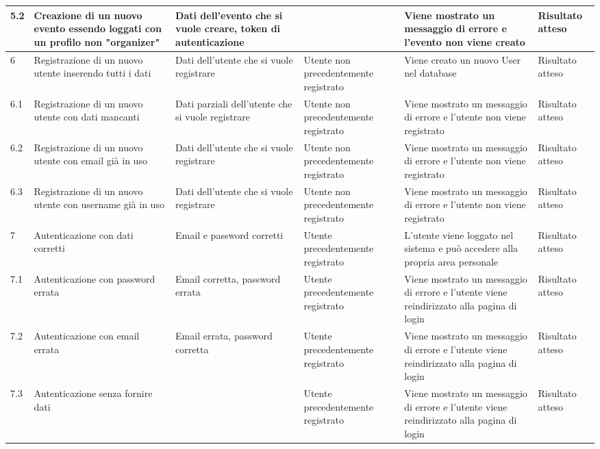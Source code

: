 \documentclass[9pt]{extarticle}
\begin{document}
\begin{table}[!htb]
{\begin{tabular}{p{.4cm} p{3.5cm} p{2.5cm} p{2.5cm} p{5cm} p{1.5cm}}
		5.2 & Creazione di un nuovo evento essendo loggati con un profilo non  "organizer" & Dati dell'evento che si vuole creare, token di autenticazione &                                             & Viene mostrato un messaggio di errore e l'evento non viene creato                                              & Risultato atteso      \\ \midrule
		6 &  Registrazione di un nuovo utente inserendo tutti i dati & Dati dell'utente che si vuole registrare & Utente non precedentemente registrato & Viene creato un nuovo User nel database & Risultato atteso \\\midrule
		6.1 &  Registrazione di un nuovo utente con dati mancanti & Dati parziali dell'utente che si vuole registrare & Utente non precedentemente registrato & Viene mostrato un messaggio di errore e l'utente non viene registrato & Risultato atteso \\\midrule
		6.2 &  Registrazione di un nuovo utente con email già in uso & Dati dell'utente che si vuole registrare & Utente non precedentemente registrato & Viene mostrato un messaggio di errore e l'utente non viene registrato & Risultato atteso \\\midrule
		6.3 &  Registrazione di un nuovo utente con username già in uso & Dati dell'utente che si vuole registrare & Utente non precedentemente registrato & Viene mostrato un messaggio di errore e l'utente non viene registrato & Risultato atteso \\\midrule
		7 &  Autenticazione con dati corretti & Email e password corretti & Utente precedentemente registrato & L'utente viene loggato nel sistema e può accedere alla propria area personale & Risultato atteso \\\midrule
		7.1 &  Autenticazione con password errata  & Email corretta, password errata & Utente precedentemente registrato & Viene mostrato un messaggio di errore e l'utente viene reindirizzato alla pagina di login & Risultato atteso \\\midrule
		7.2 &  Autenticazione con email errata  & Email errata, password corretta & Utente precedentemente registrato & Viene mostrato un messaggio di errore e l'utente viene reindirizzato alla pagina di login & Risultato atteso \\\midrule
		7.3 &  Autenticazione senza fornire dati  &  & Utente precedentemente registrato & Viene mostrato un messaggio di errore e l'utente viene reindirizzato alla pagina di login & Risultato atteso \\\midrule		
	\end{tabular}
}

\end{table}
\end{document}
